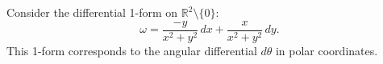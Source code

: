 \documentclass[11pt,openany]{article}
\begin{document}
\newpage\noindent
Consider the differential 1-form on \(\mathbb{R}^2 \setminus \{0\}\):
\[
\omega = \frac{-y}{x^2 + y^2} \, dx + \frac{x}{x^2 + y^2} \, dy.
\]
This 1-form corresponds to the angular differential \(d\theta\) in polar coordinates. 


\end{document}

